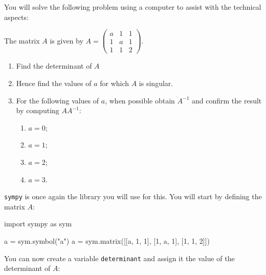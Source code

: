 You will solve the following problem using a computer to assist with the technical aspects:

The matrix \(A\) is given by \(A=\begin{pmatrix}a & 1 & 1\\ 1 & a & 1\\ 1 & 1 & 2\end{pmatrix}\).
\begin{enumerate}

\item 

Find the determinant of \(A\)

\item 

Hence find the values of \(a\) for which \(A\) is singular.

\item 

For the following values of \(a\), when possible obtain \(A ^ {- 1}\) and confirm
the result by computing \(AA^{-1}\):
\begin{enumerate}

\item 

\(a = 0\);

\item 

\(a = 1\);

\item 

\(a = 2\);

\item 

\(a = 3\).

\end{enumerate}

\end{enumerate}



\texttt{sympy} is once again the library you will use for this.
You will start by defining the matrix \(A\):




\begin{pyin}
import sympy as sym

a = sym.symbol("a")
a = sym.matrix([[a, 1, 1], [1, a, 1], [1, 1, 2]])
\end{pyin}





You can now create a variable \texttt{determinant} and assign it the value of the
determinant of \(A\):




